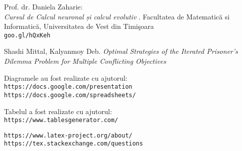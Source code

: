 \begin{thebibliography}{99}
Prof. dr. Daniela Zaharie:\\
\textit{Cursul de Calcul neuronal și calcul evolutiv}
. Facultatea de Matematică si Informatică, Universitatea de Vest din Timişoara
\\\texttt{goo.gl/hQxKeh}

Shashi Mittal, Kalyanmoy Deb.
\textit{Optimal Strategies of the Iterated Prisoner’s Dilemma Problem for
Multiple Conflicting Objectives}

 Diagramele au fost realizate cu ajutorul:
\\\texttt{https://docs.google.com/presentation}
\\\texttt{https://docs.google.com/spreadsheets/}

 Tabelul a fost realizate cu ajutorul:
\\\texttt{https://www.tablesgenerator.com/}

\texttt{https://www.latex-project.org/about/}
\texttt{https://tex.stackexchange.com/questions}

\end{thebibliography}